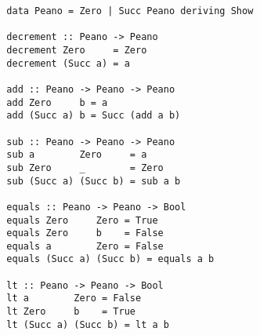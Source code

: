 \documentclass[11pt,a4paper]{article}
\theoremstyle{definition}
\begin{document}
\begin{lstlisting}
  data Peano = Zero | Succ Peano deriving Show

  decrement :: Peano -> Peano
  decrement Zero     = Zero
  decrement (Succ a) = a

  add :: Peano -> Peano -> Peano
  add Zero     b = a
  add (Succ a) b = Succ (add a b)

  sub :: Peano -> Peano -> Peano
  sub a        Zero     = a
  sub Zero     _        = Zero
  sub (Succ a) (Succ b) = sub a b

  equals :: Peano -> Peano -> Bool
  equals Zero     Zero = True
  equals Zero     b    = False
  equals a        Zero = False
  equals (Succ a) (Succ b) = equals a b

  lt :: Peano -> Peano -> Bool
  lt a        Zero = False
  lt Zero     b    = True
  lt (Succ a) (Succ b) = lt a b
\end{lstlisting}
\end{document}
